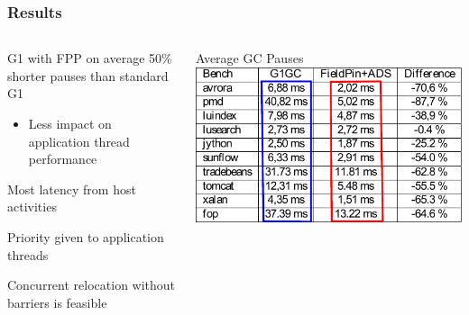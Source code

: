 \documentclass{beamer}
\newcommand{\linespace}{\vskip 0.25cm}
\begin{document}
\begin{frame}

\frametitle{Results}


\begin{columns}
\begin{column}{0.5\textwidth}

\color{red}G1 with FPP \color{black}on average 50\% shorter pauses than \color{blue}standard G1\color{black}
\begin{itemize}
\item Less impact on application thread performance
\end{itemize}

\linespace

Most latency from host activities

\linespace

Priority given to application threads

\linespace

Concurrent relocation without barriers is feasible

\end{column}

\begin{column}{0.5\textwidth}

\begin{center}
Average GC Pauses
\includegraphics[width=.90\textwidth]{Illustrations/fpp_results_2.pdf}
\end{center}
\end{column}
\end{columns}

\end{frame}
\end{document}
